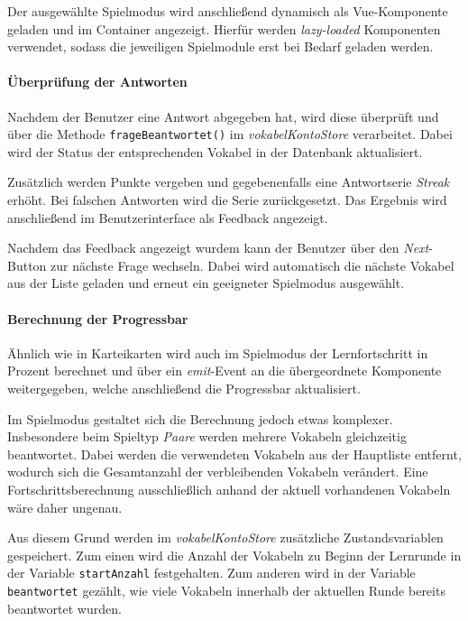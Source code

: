 Der ausgewählte Spielmodus wird anschließend dynamisch als Vue-Komponente geladen und im Container angezeigt.
Hierfür werden \textit{lazy-loaded} Komponenten verwendet, sodass die jeweiligen Spielmodule erst bei Bedarf geladen werden.

\paragraph{Überprüfung der Antworten}

Nachdem der Benutzer eine Antwort abgegeben hat, wird diese überprüft und über die Methode \texttt{frageBeantwortet()} im \textit{vokabelKontoStore} verarbeitet.
Dabei wird der Status der entsprechenden Vokabel in der Datenbank aktualisiert.

Zusätzlich werden Punkte vergeben und gegebenenfalls eine Antwortserie \textit{Streak} erhöht.
Bei falschen Antworten wird die Serie zurückgesetzt.
Das Ergebnis wird anschließend im Benutzerinterface als Feedback angezeigt.

Nachdem das Feedback angezeigt wurdem kann der Benutzer über den \textit{Next}-Button zur nächste Frage wechseln.
Dabei wird automatisch die nächste Vokabel aus der Liste geladen und erneut ein geeigneter Spielmodus ausgewählt.

\paragraph{Berechnung der Progressbar}

Ähnlich wie in Karteikarten wird auch im Spielmodus der Lernfortschritt in Prozent berechnet und über ein \textit{emit}-Event an die übergeordnete Komponente weitergegeben,
welche anschließend die Progressbar aktualisiert.

Im Spielmodus gestaltet sich die Berechnung jedoch etwas komplexer.
Insbesondere beim Spieltyp \textit{Paare} werden mehrere Vokabeln gleichzeitig beantwortet.
Dabei werden die verwendeten Vokabeln aus der Hauptliste entfernt, wodurch sich die Gesamtanzahl der verbleibenden Vokabeln verändert.
Eine Fortschrittsberechnung ausschließlich anhand der aktuell vorhandenen Vokabeln wäre daher ungenau.

Aus diesem Grund werden im \textit{vokabelKontoStore} zusätzliche Zustandsvariablen gespeichert.
Zum einen wird die Anzahl der Vokabeln zu Beginn der Lernrunde in der Variable \texttt{startAnzahl} festgehalten.
Zum anderen wird in der Variable \texttt{beantwortet} gezählt, wie viele Vokabeln innerhalb der aktuellen Runde bereits beantwortet wurden.

